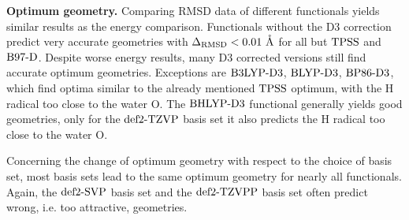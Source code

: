 \documentclass[8.5pt,twoside,twocolumn]{article}
\newcommand\eint{\enmat{E^{\te{int}}}}
\renewcommand{\Ang}{\mathring{\te{A}}}
\newcommand\kmo{\enmat{\te {kJ/mol}}}
\theoremstyle{standard}
\begin{document}
\textbf{Optimum geometry.} Comparing RMSD data of different functionals yields similar results as the energy comparison.
Functionals without the D3 correction
predict very accurate geometries with \mbox{$\DRMSD < 0.01\ \Ang$} for all but
$\text{TPSS}$ and $\text{B97-D}$.
Despite worse energy results, many D3 corrected versions still find accurate optimum geometries.
Exceptions are $\text{B3LYP}\text{-D3}$, $\text{BLYP}\text{-D3}$, $\text{BP86}\text{-D3}$, which find optima similar
to the already mentioned $\text{TPSS}$ optimum, with the H radical too close to the water O.
The $\text{BHLYP}\text{-D3}$ functional generally yields good geometries, only for the
$\text{def2-TZVP}$ basis set it also predicts the H radical too close to the water O.

Concerning the change of optimum geometry with respect to the choice of basis
set, most basis sets lead to the same optimum geometry for nearly all
functionals. Again, the \mbox{$\text{def2-SVP}$} basis set and the $\text{def2-TZVPP}$ basis set often
predict wrong, i.e. too attractive, geometries. 

% 
\end{document}
